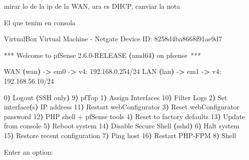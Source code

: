 \documentclass[
  10pt,
]{krantz}
\newenvironment{Shaded}{\begin{snugshade}}{\end{snugshade}}
\newcommand{\AttributeTok}[1]{\textcolor[rgb]{0.77,0.63,0.00}{#1}}
\newcommand{\ErrorTok}[1]{\textcolor[rgb]{0.64,0.00,0.00}{\textbf{#1}}}
\newcommand{\ExtensionTok}[1]{#1}
\newcommand{\KeywordTok}[1]{\textcolor[rgb]{0.13,0.29,0.53}{\textbf{#1}}}
\newcommand{\NormalTok}[1]{#1}
\newcommand{\OperatorTok}[1]{\textcolor[rgb]{0.81,0.36,0.00}{\textbf{#1}}}
\newcommand{\PreprocessorTok}[1]{\textcolor[rgb]{0.56,0.35,0.01}{\textit{#1}}}
\begin{document}
mirar lo de la ip de la WAN, ara es DHCP, canviar la nota

El que tenim en consola

\begin{Shaded}
\begin{Highlighting}[]
\ExtensionTok{VirtualBox}\NormalTok{ Virtual Machine }\AttributeTok{{-}}\NormalTok{ Netgate Device ID: 8258d4ba8668f91ae9d7}

\ExtensionTok{***}\NormalTok{ Welcome to pfSense 2.6.0{-}RELEASE }\ErrorTok{(}\ExtensionTok{amd64}\KeywordTok{)} \ExtensionTok{on}\NormalTok{ pfsense }\PreprocessorTok{***}

 \ExtensionTok{WAN} \ErrorTok{(}\ExtensionTok{wan}\KeywordTok{)}       \ExtensionTok{{-}}\OperatorTok{\textgreater{}}\NormalTok{ em0        }\AttributeTok{{-}}\OperatorTok{\textgreater{}}\NormalTok{ v4: 192.168.0.254/24}
 \ExtensionTok{LAN} \ErrorTok{(}\ExtensionTok{lan}\KeywordTok{)}       \ExtensionTok{{-}}\OperatorTok{\textgreater{}}\NormalTok{ em1        }\AttributeTok{{-}}\OperatorTok{\textgreater{}}\NormalTok{ v4: 192.168.56.10/24}

 \ExtensionTok{0}\ErrorTok{)} \ExtensionTok{Logout} \ErrorTok{(}\ExtensionTok{SSH}\NormalTok{ only}\KeywordTok{)}                  \ExtensionTok{9}\ErrorTok{)} \ExtensionTok{pfTop}
 \ExtensionTok{1}\ErrorTok{)} \ExtensionTok{Assign}\NormalTok{ Interfaces                 10}\ErrorTok{)} \ExtensionTok{Filter}\NormalTok{ Logs}
 \ExtensionTok{2}\ErrorTok{)} \ExtensionTok{Set}\NormalTok{ interface}\ErrorTok{(}\ExtensionTok{s}\KeywordTok{)} \ExtensionTok{IP}\NormalTok{ address       11}\ErrorTok{)} \ExtensionTok{Restart}\NormalTok{ webConfigurator}
 \ExtensionTok{3}\ErrorTok{)} \ExtensionTok{Reset}\NormalTok{ webConfigurator password    12}\ErrorTok{)} \ExtensionTok{PHP}\NormalTok{ shell + pfSense tools}
 \ExtensionTok{4}\ErrorTok{)} \ExtensionTok{Reset}\NormalTok{ to factory defaults         13}\ErrorTok{)} \ExtensionTok{Update}\NormalTok{ from console}
 \ExtensionTok{5}\ErrorTok{)} \ExtensionTok{Reboot}\NormalTok{ system                     14}\ErrorTok{)} \ExtensionTok{Disable}\NormalTok{ Secure Shell }\ErrorTok{(}\ExtensionTok{sshd}\KeywordTok{)}
 \ExtensionTok{6}\ErrorTok{)} \ExtensionTok{Halt}\NormalTok{ system                       15}\ErrorTok{)} \ExtensionTok{Restore}\NormalTok{ recent configuration}
 \ExtensionTok{7}\ErrorTok{)} \ExtensionTok{Ping}\NormalTok{ host                         16}\ErrorTok{)} \ExtensionTok{Restart}\NormalTok{ PHP{-}FPM}
 \ExtensionTok{8}\ErrorTok{)} \ExtensionTok{Shell}

\ExtensionTok{Enter}\NormalTok{ an option: }
\end{Highlighting}
\end{Shaded}
\end{document}
